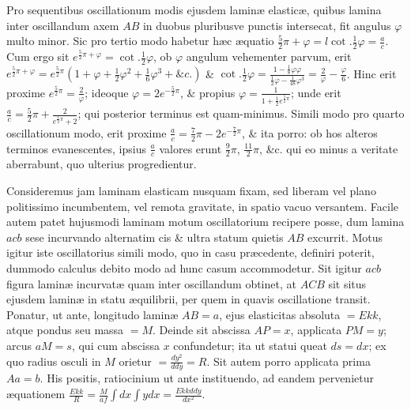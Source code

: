 Pro sequentibus oscillationum modis ejusdem laminæ elasticæ, quibus lamina inter oscillandum axem $AB$ in duobus pluribusve punctis intersecat, fit angulus $\varphi$ multo minor. Sic pro tertio modo habetur hæc æquatio $\frac52\pi+\varphi=l\cot.\frac12\varphi=\frac ac$. Cum ergo sit $e^{\frac52\pi+\varphi}=\cot.\frac12\varphi$, ob $\varphi$ angulum vehementer parvum, erit $e^{\frac52\pi+\varphi}=e^{\frac52\pi}(1+\varphi+\frac12\varphi^2+\frac16\varphi^3+\&c.)$ \& $\cot.\frac12\varphi=\frac{1-\frac18\varphi\varphi}{\frac12\varphi-\frac1{48}\varphi^3}=\frac2\varphi-\frac\varphi6$. Hinc erit proxime $e^{\frac52\pi}=\frac2\varphi$; ideoque $\varphi=2e^{-\frac52\pi}$, \& propius $\varphi=\frac1{1+\frac12e^{\frac52\pi}}$; unde erit $\frac ac=\frac52\pi+\frac2{e^{\frac12\pi}+2}$; qui posterior terminus est quam-minimus. Simili modo pro quarto oscillationum modo, erit proxime $\frac ac=\frac72\pi-2e^{-\frac72\pi}$, \& ita porro: ob hos alteros terminos evanescentes, ipsius $\frac ac$ valores erunt $\frac92\pi$, $\frac{11}2\pi$, \&c. qui eo minus a veritate aberrabunt, quo ulterius progredientur.

Consideremus jam laminam elasticam nusquam fixam, sed liberam vel plano politissimo incumbentem, vel remota gravitate, in spatio vacuo versantem. Facile autem patet hujusmodi laminam motum oscillatorium recipere posse, dum lamina $acb$ sese incurvando alternatim cis \& ultra statum quietis $AB$ excurrit. Motus igitur iste oscillatorius simili modo, quo in casu præcedente, definiri poterit, dummodo calculus debito modo ad hunc casum accommodetur. Sit igitur $acb$ figura laminæ incurvatæ quam inter oscillandum obtinet, at $ACB$ sit situs ejusdem laminæ in statu æquilibrii, per quem in quavis oscillatione transit. Ponatur, ut ante, longitudo laminæ $AB=a$, ejus elasticitas absoluta $=Ekk$, atque pondus seu massa $=M$. Deinde sit abscissa $AP=x$, applicata $PM=y$; arcus $aM=s$, qui cum abscissa $x$ confundetur; ita ut statui queat $ds=dx$; ex quo radius osculi in $M$ orietur $=\frac{dy^2}{ddy}=R$. Sit autem porro applicata prima $Aa=b$. His positis, ratiocinium ut ante instituendo, ad eandem pervenietur æquationem $\frac{Ekk}R=\frac M{af}\int dx\int ydx=\frac{Ekkddy}{dx^2}$.

